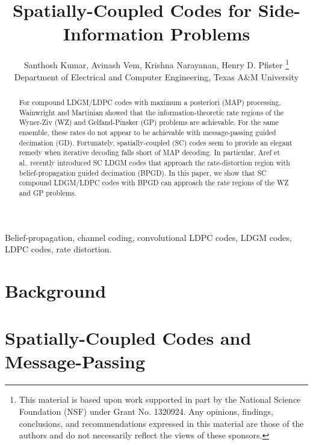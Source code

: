 \documentclass[conference]{IEEEtran}
\begin{document}
\title{Spatially-Coupled Codes for Side-Information Problems}

\author{Santhosh Kumar, Avinash Vem, Krishna Narayanan, Henry D. Pfister
  \thanks{This material is based upon work supported in part by the
    National Science Foundation (NSF) under Grant No. 1320924.
    Any opinions, findings, conclusions, and recommendations expressed
    in this material are those of the authors and do not necessarily
    reflect the views of these sponsors.}
   \\Department of Electrical and Computer Engineering, Texas A\&M University
}

\maketitle

\begin{abstract}
For compound LDGM/LDPC codes with maximum a posteriori (MAP) processing, Wainwright and Martinian showed that the information-theoretic rate regions of the Wyner-Ziv (WZ) and Gelfand-Pinsker (GP) problems are achievable.
For the same ensemble, these rates do not appear to be achievable with message-passing guided decimation (GD).
Fortunately, spatially-coupled (SC) codes seem to provide an elegant remedy when iterative decoding falls short of MAP decoding.
In particular, Aref et al.\ recently introduced SC LDGM codes that approach the rate-distortion region with belief-propagation guided decimation (BPGD).
In this paper, we show that SC compound LDGM/LDPC codes with BPGD can approach the rate regions of the WZ and GP problems.
\end{abstract}

\begin{IEEEkeywords}
  Belief-propagation, channel coding, convolutional LDPC codes, LDGM codes, LDPC codes, rate distortion.
\end{IEEEkeywords}



\section{Background}


\section{Spatially-Coupled Codes and Message-Passing}


\vspace{-0.0mm}
\end{document}
